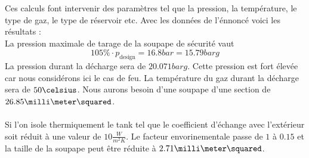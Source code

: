\documentclass[landscape,a0paper,fontscale=0.285]{baposter} %
\begin{document}
\begin{poster}
{\begin{multicols}{2}
Ces calculs font intervenir des paramètres tel que la pression, la température, le type de gaz, le type de réservoir etc. Avec les données de l'énnoncé voici les résultats :\\
La pression maximale de tarage de la soupape de sécurité vaut 
\[ 105\% \cdot p_{\text{design}} = 16.8bar = 15.79barg \]
La pression durant la décharge sera de $20.071 barg$. Cette pression est fort élevée car nous considérons ici le cas de feu. 
La température du gaz durant la décharge sera de $50{\celsius}$. 
Nous aurons besoin d'une soupape d'une section de $26.85{\milli\meter\squared}$.\\
\\
Si l'on isole thermiquement le tank tel que le coefficient d'échange avec l'extérieur soit réduit à une valeur de $10\frac{W}{m^{2}K}$. Le facteur envorinementale passe de $1$ à $0.15$ et la taille de la soupape peut être réduite à $2.71{\milli\meter\squared}$. 


\end{multicols}
}




\end{poster}
\end{document}
